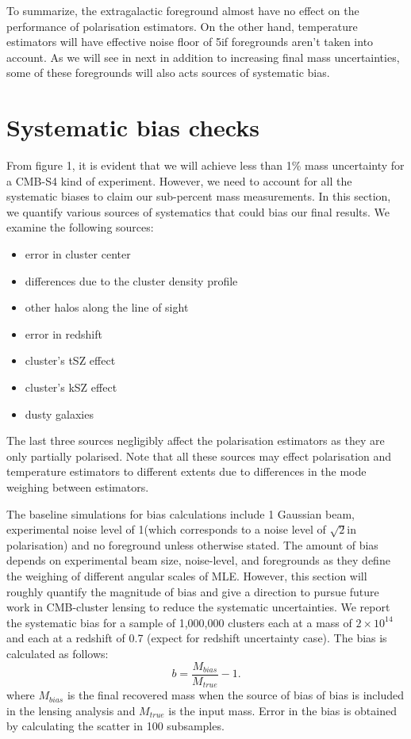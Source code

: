   To summarize, the extragalactic foreground almost have no effect on the performance of polarisation estimators. 
  On the other hand, temperature estimators will have effective noise floor of 5\ukam if foregrounds aren't taken into account. 
  As we will see in next in addition to increasing final mass uncertainties, some of these foregrounds will also acts sources of systematic bias.
  
  \section{Systematic bias checks}
  From figure 1, it is evident that we will achieve less than 1\% mass uncertainty for a CMB-S4 kind of experiment. 
  However, we need to account for all the systematic biases to claim our sub-percent mass measurements.
    In this section, we quantify various sources of systematics that could bias our final results.
    We examine the following sources:
    \begin{itemize}
    \item error in cluster center
    \item differences due to the cluster density profile
    \item other halos along the line of sight
    \item error in redshift
    \item cluster's tSZ effect
    \item cluster's kSZ effect
    \item dusty galaxies
    \end{itemize}
    The last three sources negligibly affect the polarisation estimators as they are only partially polarised. 
    Note that all these sources may effect polarisation and temperature estimators to different extents due to differences in the mode weighing between estimators.
     
 The baseline simulations for bias calculations include 1 \am Gaussian beam, experimental noise level of 1\ukam (which corresponds to a noise level of $\sqrt{2}$\ukam in polarisation) and no foreground unless otherwise stated.
  The amount of bias depends on experimental beam size, noise-level, and foregrounds as they define the weighing of different angular scales of MLE. 
  However, this section will roughly quantify the magnitude of bias and give a direction to pursue future work in CMB-cluster lensing to reduce the systematic uncertainties. 
   We report the systematic bias for a sample of 1,000,000 clusters each at a mass of $2 \times 10^{14}$ \msolar and each at a redshift of 0.7 (expect for redshift uncertainty case). The bias is calculated as follows:
   \begin{equation}
   b = \frac{M_{bias}}{M_{true}} - 1.
   \end{equation}
   where $M_{bias}$ is the final recovered mass when the source of bias of bias is included in the lensing analysis and $M_{true}$ is the input mass. 
   Error in the bias is obtained by calculating the scatter in 100 subsamples.
   
